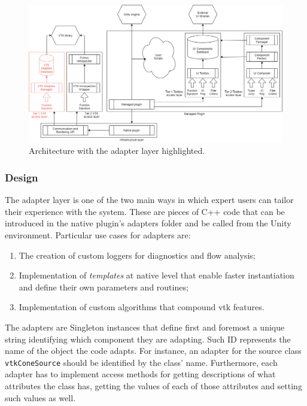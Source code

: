 \begin{figure}
    \centering
    \includegraphics[width=\textwidth]{pictures/Architecture-v0.3-adapt.png}
    \caption{Architecture with the adapter layer highlighted.}
    \label{fig:arch-adapt}
\end{figure}

\subsubsection{Design}

The adapter layer is one of the two main ways in which expert users can tailor their experience with the system. These are pieces of C++ code that can be introduced in the native plugin's adapters folder and be called from the Unity environment. Particular use cases for adapters are:

\begin{enumerate}
    \item The creation of custom loggers for diagnostics and flow analysis;
    \item Implementation of \textit{templates} at native level that enable faster instantiation and define their own parameters and routines;
    \item Implementation of custom algorithms that compound \acrshort{vtk} features.
\end{enumerate}

The adapters are Singleton instances that define first and foremost a unique string identifying which component they are adapting. Such ID represents the name of the object the code adapts. For instance, an adapter for the  source class \verb|vtkConeSource| should be identified by the class' name. Furthermore, each adapter has to implement access methods for getting descriptions of what attributes the class has, getting the values of each of those attributes and setting such values as well. 

